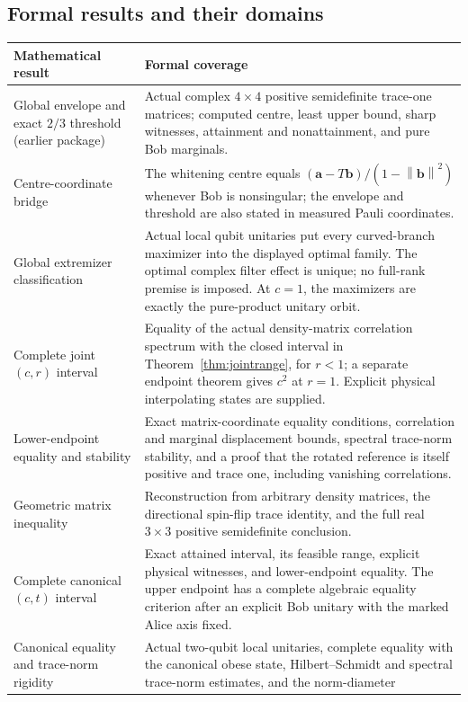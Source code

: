 \documentclass[11pt,a4paper]{article}
\theoremstyle{remark}\newtheorem{remark}[theorem]{Remark}
\newcommand{\norm}[1]{\left\lVert#1\right\rVert}
\renewcommand{\aa}{\mathbf a}\newcommand{\bb}{\mathbf b}
\begin{document}
\subsection{Formal results and their domains}
\begin{longtable}{>{\raggedright\arraybackslash}p{.32\linewidth}p{.61\linewidth}}
\toprule Mathematical result & Formal coverage\\\midrule\endhead
Global envelope and exact $2/3$ threshold (earlier package) & Actual complex
$4\times4$ positive semidefinite trace-one matrices; computed centre, least
upper bound, sharp witnesses, attainment and nonattainment, and pure Bob
marginals.\\
Centre-coordinate bridge & The whitening centre equals
$(\aa-T\bb)/(1-\norm\bb^2)$ whenever Bob is nonsingular; the envelope and
threshold are also stated in measured Pauli coordinates.\\
Global extremizer classification & Actual local qubit unitaries put every
curved-branch maximizer into the displayed optimal family. The optimal
complex filter effect is unique; no full-rank premise is imposed.
At $c=1$, the maximizers are exactly the pure-product unitary orbit.\\
Complete joint $(c,r)$ interval & Equality of the actual density-matrix
correlation spectrum with the closed interval in
Theorem~\ref{thm:jointrange}, for $r<1$; a separate endpoint theorem gives
$c^2$ at $r=1$. Explicit physical interpolating states are supplied.\\
Lower-endpoint equality and stability & Exact matrix-coordinate equality
conditions, correlation and marginal displacement bounds, spectral
trace-norm stability, and a proof that the rotated reference is itself
positive and trace one, including vanishing correlations.\\
Geometric matrix inequality & Reconstruction from arbitrary density
matrices, the directional spin-flip trace identity, and the full real
$3\times3$ positive semidefinite conclusion.\\
Complete canonical $(c,t)$ interval & Exact attained interval, its feasible
range, explicit physical witnesses, and lower-endpoint equality. The
upper endpoint has a complete algebraic equality criterion after an
explicit Bob unitary with the marked Alice axis fixed.\\
Canonical equality and trace-norm rigidity & Actual two-qubit local
unitaries, complete equality with the canonical obese state,
Hilbert--Schmidt and spectral trace-norm estimates, and the norm-diameter

\end{longtable}
\end{document}
